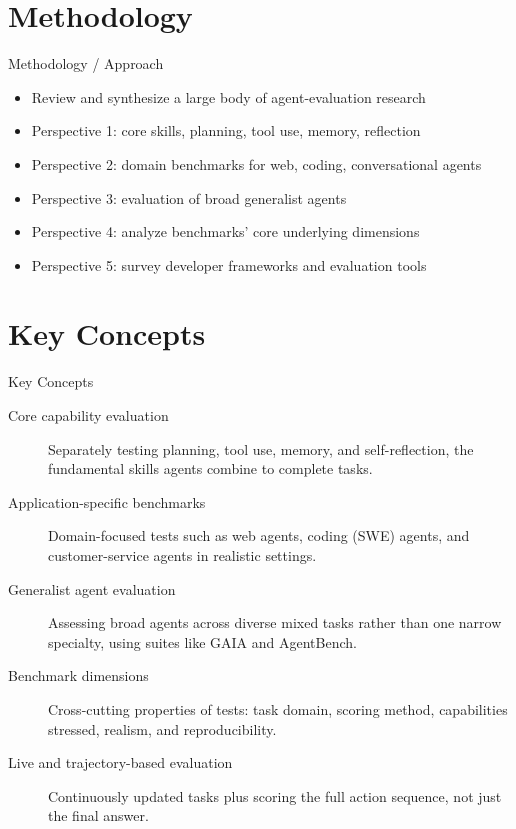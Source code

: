 \documentclass[10pt]{beamer}
\begin{document}
\section{Methodology}
\begin{frame}[allowframebreaks]{Methodology / Approach}
\begin{itemize}
  \item Review and synthesize a large body of agent-evaluation research
  \item Perspective 1: core skills, planning, tool use, memory, reflection
  \item Perspective 2: domain benchmarks for web, coding, conversational agents
  \item Perspective 3: evaluation of broad generalist agents
  \item Perspective 4: analyze benchmarks' core underlying dimensions
  \item Perspective 5: survey developer frameworks and evaluation tools
\end{itemize}
\end{frame}

\section{Key Concepts}
\begin{frame}[allowframebreaks]{Key Concepts}
  \begin{description}
    \item[Core capability evaluation] Separately testing planning, tool use, memory, and self-reflection, the fundamental skills agents combine to complete tasks.
    \item[Application-specific benchmarks] Domain-focused tests such as web agents, coding (SWE) agents, and customer-service agents in realistic settings.
    \item[Generalist agent evaluation] Assessing broad agents across diverse mixed tasks rather than one narrow specialty, using suites like GAIA and AgentBench.
    \item[Benchmark dimensions] Cross-cutting properties of tests: task domain, scoring method, capabilities stressed, realism, and reproducibility.
    \item[Live and trajectory-based evaluation] Continuously updated tasks plus scoring the full action sequence, not just the final answer.
  \end{description}
\end{frame}
\end{document}
